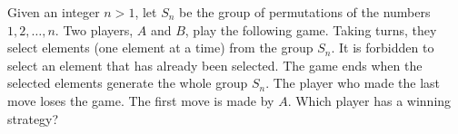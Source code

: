 \documentclass{article}
\begin{document}
\setlength{\parindent}{0pt}
Given an integer $n>1$, let $S_{n}$ be the group of permutations of the numbers $1,2,\dots,n$. Two players, $A$ and $B$, play the following game. Taking turns, they select elements (one element at a time) from the group $S_{n}$. It is forbidden to select an element that has already been selected. The game ends when the selected elements generate the whole group $S_{n}$. The player who made the last move loses the game. The first move is made by $A$. Which player has a winning strategy?
\end{document}
